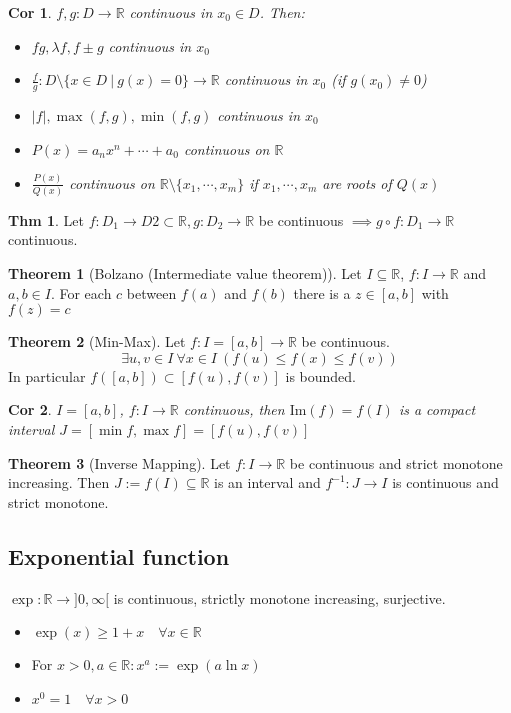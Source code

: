 \documentclass[a4paper, 10pt]{article}
\newtheorem*{corollary}{Cor}
\theoremstyle{definition}
\newtheorem*{theorem}{Thm}
\theoremstyle{named}
\newtheorem*{ntheorem_wrapper}{Theorem}
\newenvironment{ntheorem}%
    {\begin{mdframed}[style=important]\begin{ntheorem_wrapper}}%
    {\end{ntheorem_wrapper}\end{mdframed}}
\newcommand{\R}{\mathbb{R}}
\begin{document}
\begin{corollary}
    $f, g: D \to \R$ continuous in $x_0 \in D$. Then:
    \begin{itemize}
        \item $fg, \lambda f, f \pm g$ continuous in $x_0$
        \item $\frac{f}{g}: D \setminus \{x \in D \ | \ g(x) = 0\} \to \R$ continuous in $x_0$ (if $g(x_0) \neq 0$)
        \item $|f|, \max(f, g), \min(f, g)$ continuous in $x_0$
        \item $P(x) = a_n x^n + \cdots + a_0$ continuous on $\R$
        \item $\frac{P(x)}{Q(x)}$ continuous on $\R \setminus \{x_1, \cdots, x_m\}$ if $x_1, \cdots, x_m$ are roots of $Q(x)$
    \end{itemize}
\end{corollary}

\begin{theorem}
    Let $f: D_1 \to D2 \subset \R, g: D_2 \to \R$ be continuous $\implies g \circ f : D_1 \to \R$ continuous.
\end{theorem}

\begin{ntheorem}[Bolzano (Intermediate value theorem)]
    Let $I \subseteq \R$, $f : I \to \R$ and $a, b \in I$. For each $c$ between $f(a)$ and $f(b)$ there is a $z \in [a, b]$ with $f(z) = c$
\end{ntheorem}

\begin{ntheorem}[Min-Max]
    Let $f: I = [a, b] \to \R$ be continuous.
    $$\exists u, v \in I \ \forall x \in I \ (f(u) \leq f(x) \leq f(v))$$
    In particular $f([a, b]) \subset [f(u), f(v)]$ is bounded.
\end{ntheorem}

\begin{corollary}
    $I = [a, b]$, $f: I \to \R$ continuous, then $\text{Im}(f) = f(I)$ is a compact interval $J = [\min f, \max f] = [f(u), f(v)]$
\end{corollary}

\begin{ntheorem}[Inverse Mapping]
    Let $f: I \to \R$ be continuous and strict monotone increasing. Then $J := f(I) \subseteq \R$ is an interval and $f^{-1}: J \to I$ is continuous and strict monotone.
\end{ntheorem}

\subsection{Exponential function}
$\exp: \R \to ]0, \infty [$ is continuous, strictly monotone increasing, surjective.
\begin{itemize}
    \item $\exp(x) \geq 1 + x \quad \forall x \in \R$
    \item For $x > 0, a \in \R: x^a := \exp(a \ln x)$
    \item $x^0 = 1 \quad \forall x > 0$
\end{itemize}
\end{document}
